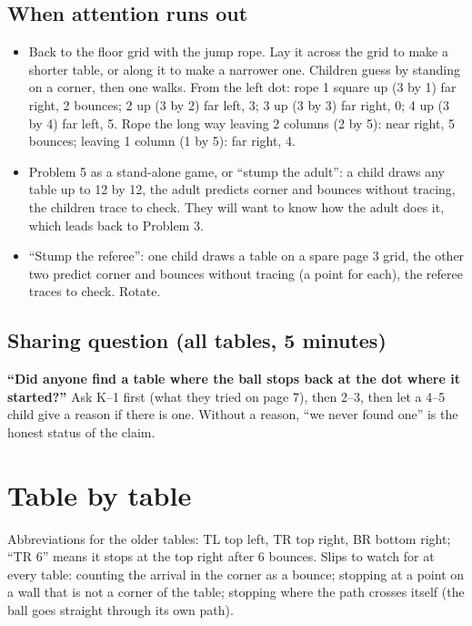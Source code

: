 \documentclass[11pt,letterpaper]{article}
\begin{document}
\subsection{When attention runs out}
\begin{itemize}[leftmargin=2.9em, labelwidth=2.5em, labelsep=0.4em, align=left, itemsep=2pt]
\item[\textbf{K--1}] Back to the floor grid with the jump rope. Lay it across the grid to make a shorter table, or along it to make a narrower one. Children guess by standing on a corner, then one walks. From the left dot: rope 1 square up (3 by 1) far right, 2 bounces; 2 up (3 by 2) far left, 3; 3 up (3 by 3) far right, 0; 4 up (3 by 4) far left, 5. Rope the long way leaving 2 columns (2 by 5): near right, 5 bounces; leaving 1 column (1 by 5): far right, 4.
\item[\textbf{2--3}] Problem 5 as a stand-alone game, or ``stump the adult'': a child draws any table up to 12 by 12, the adult predicts corner and bounces without tracing, the children trace to check. They will want to know how the adult does it, which leads back to Problem 3.
\item[\textbf{4--5}] ``Stump the referee'': one child draws a table on a spare page 3 grid, the other two predict corner and bounces without tracing (a point for each), the referee traces to check. Rotate.
\end{itemize}

\subsection{Sharing question (all tables, 5 minutes)}
\textbf{``Did anyone find a table where the ball stops back at the dot where it started?''} Ask K--1 first (what they tried on page 7), then 2--3, then let a 4--5 child give a reason if there is one. Without a reason, ``we never found one'' is the honest status of the claim.

\section{Table by table}

Abbreviations for the older tables: TL top left, TR top right, BR bottom right; ``TR 6'' means it stops at the top right after 6 bounces. Slips to watch for at every table: counting the arrival in the corner as a bounce; stopping at a point on a wall that is not a corner of the table; stopping where the path crosses itself (the ball goes straight through its own path).
\end{document}
